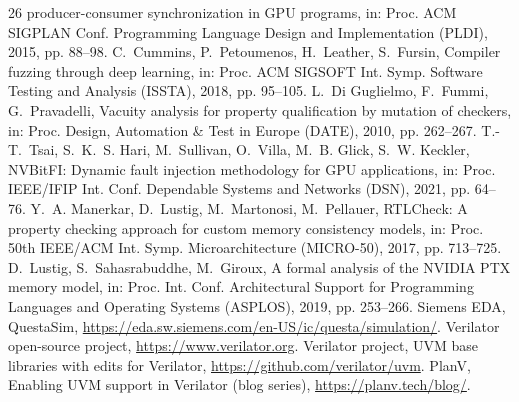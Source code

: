 \documentclass[review,12pt]{elsarticle}
\begin{document}
\begin{thebibliography}{26}
	producer-consumer synchronization in GPU programs, in: Proc. ACM
	SIGPLAN Conf. Programming Language Design and Implementation (PLDI),
	2015, pp. 88--98.
	 C.~Cummins, P.~Petoumenos, H.~Leather,
	S.~Fursin, Compiler fuzzing through deep learning, in: Proc. ACM
	SIGSOFT Int. Symp. Software Testing and Analysis (ISSTA), 2018,
	pp. 95--105.
	 L.~Di Guglielmo, F.~Fummi, G.~Pravadelli,
	Vacuity analysis for property qualification by mutation of checkers,
	in: Proc. Design, Automation \& Test in Europe (DATE), 2010,
	pp. 262--267.
	 T.-T.~Tsai, S.~K.~S. Hari, M.~Sullivan, O.~Villa,
	M.~B. Glick, S.~W. Keckler, NVBitFI: Dynamic fault injection
	methodology for GPU applications, in: Proc. IEEE/IFIP Int. Conf.
	Dependable Systems and Networks (DSN), 2021, pp. 64--76.
	 Y.~A. Manerkar, D.~Lustig, M.~Martonosi,
	M.~Pellauer, RTLCheck: A property checking approach for custom
	memory consistency models, in: Proc. 50th IEEE/ACM Int. Symp.
	Microarchitecture (MICRO-50), 2017, pp. 713--725.
	 D.~Lustig, S.~Sahasrabuddhe, M.~Giroux, A formal
	analysis of the NVIDIA PTX memory model, in: Proc. Int. Conf.
	Architectural Support for Programming Languages and Operating
	Systems (ASPLOS), 2019, pp. 253--266.
	 Siemens EDA, QuestaSim,
	\url{https://eda.sw.siemens.com/en-US/ic/questa/simulation/}.
	 Verilator open-source project,
	\url{https://www.verilator.org}.
	 Verilator project, UVM base libraries with
	edits for Verilator, \url{https://github.com/verilator/uvm}.
	 PlanV, Enabling UVM support in Verilator
	(blog series), \url{https://planv.tech/blog/}.
\end{thebibliography}
\end{document}
